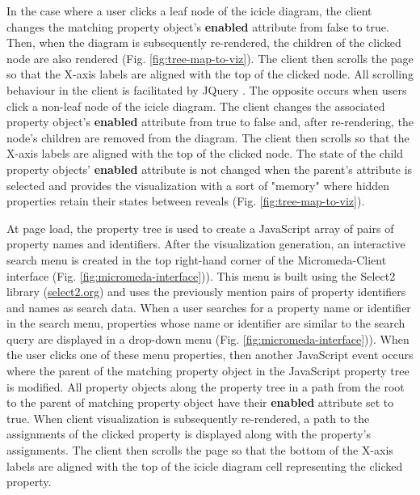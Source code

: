 In the case where a user clicks a leaf node of the icicle diagram, the client changes the matching property object's \textbf{enabled} attribute from false to true. Then, when the diagram is subsequently re-rendered, the children of the clicked node are also rendered (Fig. \ref{fig:tree-map-to-viz}). The client then scrolls the page so that the X-axis labels are aligned with the top of the clicked node. All scrolling behaviour in the client is facilitated by JQuery \cite{li2012jquery}. The opposite occurs when users click a non-leaf node of the icicle diagram. The client changes the associated property object's \textbf{enabled} attribute from true to false and, after re-rendering, the node's children are removed from the diagram. The client then scrolls so that the X-axis labels are aligned with the top of the clicked node. The state of the child property objects' \textbf{enabled} attribute is not changed when the parent's attribute is selected and provides the visualization with a sort of "memory" where hidden properties retain their states between reveals (Fig. \ref{fig:tree-map-to-viz}).

At page load, the property tree is used to create a JavaScript array of pairs of property names and identifiers. After the visualization generation, an interactive search menu is created in the top right-hand corner of the Micromeda-Client interface (Fig. \ref{fig:micromeda-interface})). This menu is built using the Select2 library \cite{select2} (\href{select2.org}{select2.org}) and uses the previously mention pairs of property identifiers and names as search data. When a user searches for a property name or identifier in the search menu, properties whose name or identifier are similar to the search query are displayed in a drop-down menu (Fig. \ref{fig:micromeda-interface})). When the user clicks one of these menu properties, then another JavaScript event occurs where the parent of the matching property object in the JavaScript property tree is modified. All property objects along the property tree in a path from the root to the parent of matching property object have their \textbf{enabled} attribute set to true. When client visualization is subsequently re-rendered, a path to the assignments of the clicked property is displayed along with the property's assignments. The client then scrolls the page so that the bottom of the X-axis labels are aligned with the top of the icicle diagram cell representing the clicked property.

